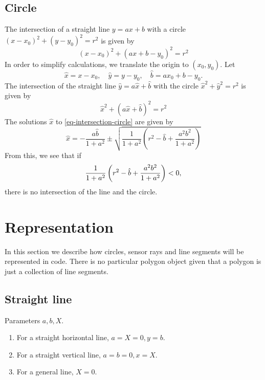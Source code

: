 \documentclass[11pt]{article}
\newcommand{\bhat}{{\hat{b}}}
\newcommand{\xhat}{{\hat{x}}}
\newcommand{\yhat}{{\hat{y}}}
\begin{document}
\subsection{Circle}
\label{sec-intersection-circle}
The intersection of a straight line $y=ax+b$ with a circle 
$(x-x_0)^2+(y-y_0)^2=r^2$ is given by
\begin{equation}
    (x-x_0)^2 + (ax+b - y_0)^2 = r^2 
\end{equation}
In order to simplify calculations, we translate the origin to $(x_0, y_0)$. Let
\begin{equation}
    \xhat = x-x_0,\quad \yhat = y-y_0,\quad \bhat = ax_0 + b - y_0.
\end{equation}
The intersection of the straight line $\yhat = a\xhat + \bhat$ with the circle
$\xhat^2 + \yhat^2 = r^2$ is given by
\begin{equation}
    \xhat^2 + (a\xhat + \bhat)^2 = r^2 \label{eq-intersection-circle}
\end{equation}
The solutions $\xhat$ to \eqref{eq-intersection-circle} are given by
\begin{equation}
    \xhat = -\frac{a\bhat}{1+a^2}\pm 
        \sqrt{\frac{1}{1+a^2}\left(r^2-\bhat+\frac{a^2 b^2}{1+a^2}\right)}
\end{equation}
From this, we see that if 
\begin{equation}
    \frac{1}{1+a^2}\left(r^2-\bhat+\frac{a^2 b^2}{1+a^2}\right) < 0, \notag
\end{equation}
there is no intersection of the line and the circle.

\section{Representation}
\label{sec-representation}
In this section we describe how circles, sensor rays and line segments will be
represented in code. There is no particular polygon object given that a
polygon is just a collection of line segments.

\subsection*{Straight line}

Parameters $a, b, X$. 

\begin{enumerate}
    \item For a  straight horizontal line, $a=X=0, y=b$.
    \item For a  straight vertical line, $a=b=0, x=X$.
    \item For a general line, $X=0$.
\end{enumerate}
\end{document}
